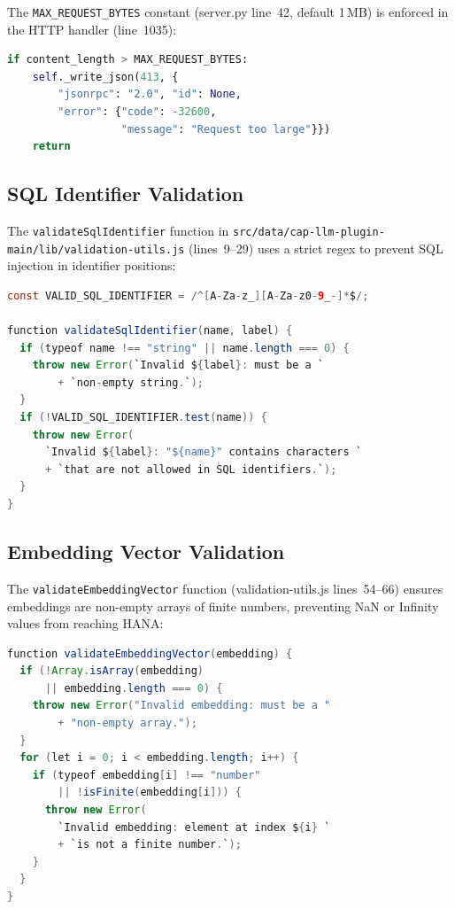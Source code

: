 \documentclass[11pt]{article}
\newcommand{\filepath}[1]{\texttt{#1}}
\newcommand{\code}[1]{\texttt{#1}}
\begin{document}
The \code{MAX\_REQUEST\_BYTES} constant (server.py line~42, default
1\,MB) is enforced in the HTTP handler (line~1035):

\begin{lstlisting}[language=Python,caption={Request size check (server.py lines 1034--1037)},label=lst:max-request]
if content_length > MAX_REQUEST_BYTES:
    self._write_json(413, {
        "jsonrpc": "2.0", "id": None,
        "error": {"code": -32600,
                  "message": "Request too large"}})
    return
\end{lstlisting}

\subsection{SQL Identifier Validation}

The \code{validateSqlIdentifier} function in
\filepath{src/data/cap-llm-plugin-main/lib/validation-utils.js}
(lines~9--29) uses a strict regex to prevent SQL injection in
identifier positions:

\begin{lstlisting}[language=Java,caption={SQL identifier validation (validation-utils.js lines 9--29)},label=lst:sql-valid]
const VALID_SQL_IDENTIFIER = /^[A-Za-z_][A-Za-z0-9_-]*$/;

function validateSqlIdentifier(name, label) {
  if (typeof name !== "string" || name.length === 0) {
    throw new Error(`Invalid ${label}: must be a `
        + `non-empty string.`);
  }
  if (!VALID_SQL_IDENTIFIER.test(name)) {
    throw new Error(
      `Invalid ${label}: "${name}" contains characters `
      + `that are not allowed in SQL identifiers.`);
  }
}
\end{lstlisting}

\subsection{Embedding Vector Validation}

The \code{validateEmbeddingVector} function (validation-utils.js
lines~54--66) ensures embeddings are non-empty arrays of finite numbers,
preventing NaN or Infinity values from reaching HANA:

\begin{lstlisting}[language=Java,caption={Embedding validation (validation-utils.js lines 54--66)},label=lst:embed-valid]
function validateEmbeddingVector(embedding) {
  if (!Array.isArray(embedding)
      || embedding.length === 0) {
    throw new Error("Invalid embedding: must be a "
        + "non-empty array.");
  }
  for (let i = 0; i < embedding.length; i++) {
    if (typeof embedding[i] !== "number"
        || !isFinite(embedding[i])) {
      throw new Error(
        `Invalid embedding: element at index ${i} `
        + `is not a finite number.`);
    }
  }
}
\end{lstlisting}
\end{document}
